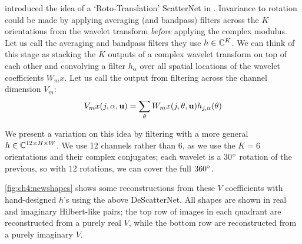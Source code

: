 \citeauthor{sifre_rotation_2013} introduced the idea of a `Roto-Translation'
ScatterNet in \cite{sifre_rotation_2013}. Invariance to rotation could be made
by applying averaging (and bandpass) filters across the $K$ orientations from
the wavelet transform \emph{before} applying the complex modulus. Let us call
the averaging and bandpass filters they use $h \in \complexes[K]$.
We can think of this stage as stacking the $K$ outputs of a
complex wavelet transform on top of each other and convolving a filter
$h_\alpha$ over all spatial locations of the wavelet coefficients $W_m x$.
Let us call the output from filtering across the channel dimension $V_m$:
\begin{equation}
  V_m x(j, \alpha, \xy) = \sum_{\theta} W_{m}x(j, \theta, \xy) h_{j, \alpha}(\theta)
\end{equation}

We present a variation on this idea by filtering with a more general
$h\in \complexes[12\x H\x W]$. We use 12 channels rather than 6, as we use
the $K=6$ orientations and their complex conjugates; each wavelet is a 30$\degs$
rotation of the previous, so with 12 rotations, we can cover the full
$360\degs$.

\autoref{fig:ch4:newshapes} shows some reconstructions from these $V$ coefficients
with hand-designed $h$'s using the above DeScatterNet.
All shapes are shown in real and imaginary Hilbert-like pairs; the top row of
images in each quadrant are reconstructed from a purely real $V$, while the bottom row
are reconstructed from a purely imaginary $V$.

